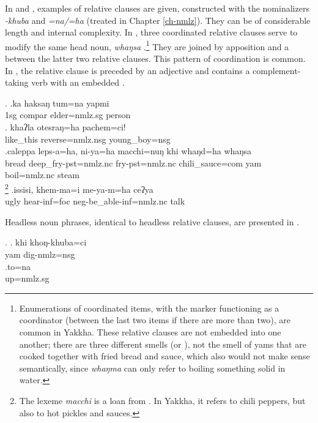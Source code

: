  In \Next and \NNext, examples of relative clauses are given, constructed with the nominalizers \emph{-khuba} and \emph{=na/=ha} (treated in Chapter \ref{ch-nmlz}). They can be of considerable length and internal complexity. 
 In \Next[c], three coordinated relative clauses  serve to modify the same head noun, \emph{whaŋsa} .\footnote{Enumerations of coordinated items, with the  marker functioning as a coordinator (between the last two items if there are more than two), are common in Yakkha. These relative clauses are not embedded into one  another; there are three different smells (or ), not the smell of yams that are cooked together with fried bread and sauce, which also would not make sense semantically, since \emph{whaŋma} can only refer to boiling something solid in water.} They are joined by apposition and a  between the latter two relative clauses. This pattern of coordination is common. In \Next[d], the relative clause is preceded by an adjective and contains a complement-taking verb with an embedded .
 
 \ex. \ag.ka  haksaŋ tum=na  yapmi\\
 {\sc 1sg} {\sc compar} elder{\sc =nmlz.sg} person\\
  
 \bg. khaʔla   otesraŋ=ha   pachem=ci!\\
 like\_this reverse{\sc =nmlz.nsg} young\_boy{\sc =nsg}\\
  
 \bg.caleppa leps-a=ha,     ni-ya=ha macchi=nuŋ    khi whaŋd=ha     whaŋsa\\
 bread deep\_fry{\sc [3sg]-pst=nmlz.nc} fry{\sc [3sg]-pst=nmlz.nc} chili\_sauce{\sc =com} yam boil{\sc [3sg;pst]=nmlz.nc} steam\\
 \footnote{The lexeme \emph{macchi} is a loan from . In Yakkha, it refers to chili peppers, but also to hot pickles and sauces.} 
\bg.issisi, khem-ma=i          me-ya-m=ha                         ceʔya\\
ugly hear{\sc -inf=foc} {\sc neg-}be\_able{\sc -inf=nmlz.nc} talk\\
  

Headless noun phrases, identical to headless relative clauses, are presented in \Next. 

\ex. \ag.  khi khoŋ-khuba=ci\\
yam dig{\sc -nmlz=nsg}\\
 
\bg.to=na\\
up{\sc =nmlz.sg}\\


